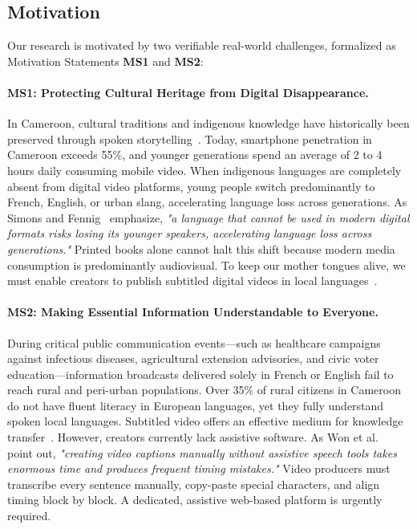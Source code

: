 \documentclass[a4paper,11pt]{article}
\begin{document}
\subsection{Motivation}
\label{sec:chap1_motivation}

Our research is motivated by two verifiable real-world challenges, formalized as Motivation Statements \textbf{MS1} and \textbf{MS2}:

\paragraph{\textbf{MS1: Protecting Cultural Heritage from Digital Disappearance.}}
In Cameroon, cultural traditions and indigenous knowledge have historically been preserved through spoken storytelling~\cite{grenoble2010language}. Today, smartphone penetration in Cameroon exceeds 55\%, and younger generations spend an average of 2 to 4 hours daily consuming mobile video. When indigenous languages are completely absent from digital video platforms, young people switch predominantly to French, English, or urban slang, accelerating language loss across generations. As Simons and Fennig~\cite{simons2020building} emphasize, \textit{"a language that cannot be used in modern digital formats risks losing its younger speakers, accelerating language loss across generations."} Printed books alone cannot halt this shift because modern media consumption is predominantly audiovisual. To keep our mother tongues alive, we must enable creators to publish subtitled digital videos in local languages~\cite{adelani2022masakhaner}.

\paragraph{\textbf{MS2: Making Essential Information Understandable to Everyone.}}
During critical public communication events—such as healthcare campaigns against infectious diseases, agricultural extension advisories, and civic voter education—information broadcasts delivered solely in French or English fail to reach rural and peri-urban populations. Over 35\% of rural citizens in Cameroon do not have fluent literacy in European languages, yet they fully understand spoken local languages. Subtitled video offers an effective medium for knowledge transfer~\cite{mayer2020multimedia, bigioi2023multilingual}. However, creators currently lack assistive software. As Won et al.~\cite{won2025endtoend} point out, \textit{"creating video captions manually without assistive speech tools takes enormous time and produces frequent timing mistakes."} Video producers must transcribe every sentence manually, copy-paste special characters, and align timing block by block. A dedicated, assistive web-based platform is urgently required.
\end{document}
